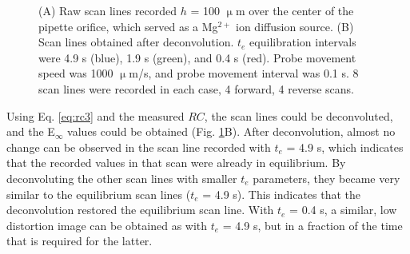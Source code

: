 \begin{figure}[h]
\centering
{}

\caption[Raw, and deconvoluted linescans conducted with the Mg$^{2+}$ ISME]{(A) Raw scan lines recorded $h$ = 100 $\upmu$m over the center of the pipette orifice, which served as a Mg$^{2+}$ ion diffusion source.
(B) Scan lines obtained after deconvolution.
$t_e$ equilibration intervals were 4.9 s (blue), 1.9 s (green), and 0.4 s (red).
Probe movement speed was 1000 $\upmu$m/s, and probe movement interval was 0.1 s.
8 scan lines were recorded in each case, 4 forward, 4 reverse scans.}
\label{fig:lines}
\end{figure}


Using Eq. \ref{eq:rc3} and the measured $RC$, the scan lines could be deconvoluted, and the E$_{\infty}$ values could be obtained (Fig. \ref{fig:lines}B).
After deconvolution, almost no change can be observed in the scan line recorded with $t_e$ = 4.9 s, which indicates that the recorded values in that scan were already in equilibrium.
By deconvoluting the other scan lines with smaller $t_e$ parameters, they became very similar to the equilibrium scan lines ($t_e$ = 4.9 s).
This indicates that the deconvolution restored the equilibrium scan line.
With $t_e$ = 0.4 s, a similar, low distortion image can be obtained as with $t_e$ = 4.9 s, but in a fraction of the time that is required for the latter.


